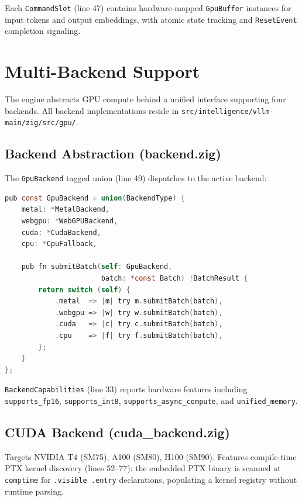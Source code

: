 \documentclass[11pt]{article}
\begin{document}
Each \texttt{CommandSlot} (line 47) contains hardware-mapped \texttt{GpuBuffer}
instances for input tokens and output embeddings, with atomic state tracking
and \texttt{ResetEvent} completion signaling.

\section{Multi-Backend Support}
\label{sec:backends}

The engine abstracts GPU compute behind a unified interface supporting four
backends. All backend implementations reside in
\texttt{src/intelligence/vllm-main/zig/src/gpu/}.

\subsection{Backend Abstraction (backend.zig)}

The \texttt{GpuBackend} tagged union (line 49) dispatches to the active backend:

\begin{lstlisting}[language=C,caption={Unified backend dispatch (backend.zig:49--66)}]
pub const GpuBackend = union(BackendType) {
    metal: *MetalBackend,
    webgpu: *WebGPUBackend,
    cuda: *CudaBackend,
    cpu: *CpuFallback,

    pub fn submitBatch(self: GpuBackend,
                       batch: *const Batch) !BatchResult {
        return switch (self) {
            .metal  => |m| try m.submitBatch(batch),
            .webgpu => |w| try w.submitBatch(batch),
            .cuda   => |c| try c.submitBatch(batch),
            .cpu    => |f| try f.submitBatch(batch),
        };
    }
};
\end{lstlisting}

\texttt{BackendCapabilities} (line 33) reports hardware features including
\texttt{supports\_fp16}, \texttt{supports\_int8}, \texttt{supports\_async\_compute},
and \texttt{unified\_memory}.

\subsection{CUDA Backend (cuda\_backend.zig)}

Targets NVIDIA T4 (SM75), A100 (SM80), H100 (SM90). Features compile-time PTX
kernel discovery (lines 52--77): the embedded PTX binary is scanned at
\texttt{comptime} for \texttt{.visible .entry} declarations, populating a
kernel registry without runtime parsing.
\end{document}
